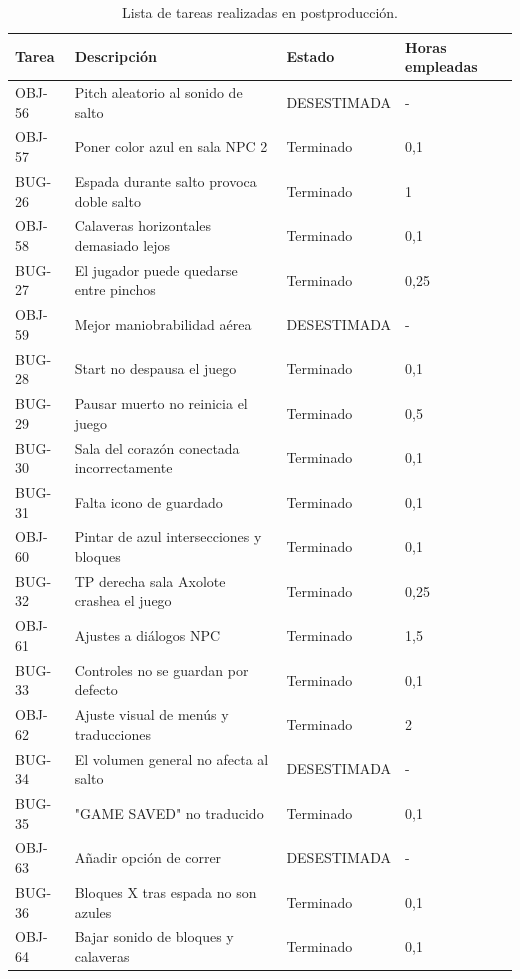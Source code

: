 \begin{table}[hbt]
    \centering
    \begin{tabular}{|l|p{6cm}|l|p{2cm}|}
    \hline
    \textbf{Tarea} & \textbf{Descripción} & \textbf{Estado} & \textbf{Horas empleadas} \\ \hline
    OBJ-56 & Pitch aleatorio al sonido de salto & DESESTIMADA & - \\ \hline
    OBJ-57 & Poner color azul en sala NPC 2 & Terminado & 0,1 \\ \hline
    BUG-26 & Espada durante salto provoca doble salto & Terminado & 1 \\ \hline
    OBJ-58 & Calaveras horizontales demasiado lejos & Terminado & 0,1 \\ \hline
    BUG-27 & El jugador puede quedarse entre pinchos & Terminado & 0,25 \\ \hline
    OBJ-59 & Mejor maniobrabilidad aérea & DESESTIMADA & - \\ \hline
    BUG-28 & Start no despausa el juego & Terminado & 0,1 \\ \hline
    BUG-29 & Pausar muerto no reinicia el juego & Terminado & 0,5 \\ \hline
    BUG-30 & Sala del corazón conectada incorrectamente & Terminado & 0,1 \\ \hline
    BUG-31 & Falta icono de guardado & Terminado & 0,1 \\ \hline
    OBJ-60 & Pintar de azul intersecciones y bloques & Terminado & 0,1 \\ \hline
    BUG-32 & TP derecha sala Axolote crashea el juego & Terminado & 0,25 \\ \hline
    OBJ-61 & Ajustes a diálogos NPC & Terminado & 1,5 \\ \hline
    BUG-33 & Controles no se guardan por defecto & Terminado & 0,1 \\ \hline
    OBJ-62 & Ajuste visual de menús y traducciones & Terminado & 2 \\ \hline
    BUG-34 & El volumen general no afecta al salto & DESESTIMADA & - \\ \hline
    BUG-35 & "GAME SAVED" no traducido & Terminado & 0,1 \\ \hline
    OBJ-63 & Añadir opción de correr & DESESTIMADA & - \\ \hline
    BUG-36 & Bloques X tras espada no son azules & Terminado & 0,1 \\ \hline
    OBJ-64 & Bajar sonido de bloques y calaveras & Terminado & 0,1 \\ \hline
    \end{tabular}
    \caption{Lista de tareas realizadas en postproducción.}
    \label{tab:postpro4}
\end{table}


